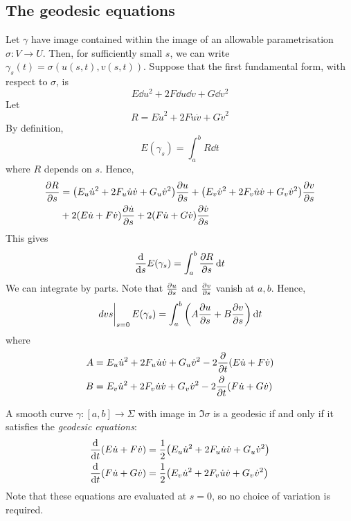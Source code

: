 \subsection{The geodesic equations}
Let \( \gamma \) have image contained within the image of an allowable parametrisation \( \sigma \colon V \to U \).
Then, for sufficiently small \( s \), we can write \( \gamma_s(t) = \sigma(u(s,t), v(s,t)) \).
Suppose that the first fundamental form, with respect to \( \sigma \), is
\[ E \dd{u}^2 + 2F \dd{u} \dd{v} + G \dd{v}^2 \]
Let
\[ R = E \dot u^2 + 2F \dot u \dot v + G \dot v^2 \]
By definition,
\[ E(\gamma_s) = \int_a^b R \dd{t} \]
where \( R \) depends on \( s \).
Hence,
\begin{align*}
	\pdv{R}{s} &= \qty(E_u \dot u^2 + 2F_u \dot u \dot v + G_u \dot v^2) \pdv{u}{s} + \qty(E_v \dot v^2 + 2F_v \dot u \dot v + G_v \dot v^2) \pdv{v}{s} \\
	&+ 2 (E \dot u + F \dot v) \pdv{\dot u}{s} + 2(F \dot u + G \dot v) \pdv{\dot v}{s}
\end{align*}
This gives
\[ \dv{s} E(\gamma_s) = \int_a^b \pdv{R}{s} \dd{t} \]
We can integrate by parts.
Note that \( \pdv{u}{s} \) and \( \pdv{v}{s} \) vanish at \( a,b \).
Hence,
\[ \eval{dv{s}}_{s=0} E(\gamma_s) = \int_a^b \qty(A \pdv{u}{s} + B \pdv{v}{s}) \dd{t} \]
where
\begin{align*}
	A &= E_u \dot u^2 + 2F_u \dot u \dot v + G_u \dot v^2 - 2 \pdv{t} \qty(E \dot u + F \dot v) \\
	B &= E_v \dot u^2 + 2F_v \dot u \dot v + G_v \dot v^2 - 2 \pdv{t} \qty(F \dot u + G \dot v)
\end{align*}
\begin{corollary}
	A smooth curve \( \gamma \colon [a,b] \to \Sigma \) with image in \( \Im \sigma \) is a geodesic if and only if it satisfies the \textit{geodesic equations}:
	\begin{align*}
		\dv{t} \qty(E \dot u + F \dot v) &= \frac{1}{2} \qty( E_u \dot u^2 + 2F_u \dot u \dot v + G_u \dot v^2 ) \\
		\dv{t} \qty(F \dot u + G \dot v) &= \frac{1}{2} \qty( E_v \dot u^2 + 2F_v \dot u \dot v + G_v \dot v^2 )
	\end{align*}
	Note that these equations are evaluated at \( s = 0 \), so no choice of variation is required.
\end{corollary}
